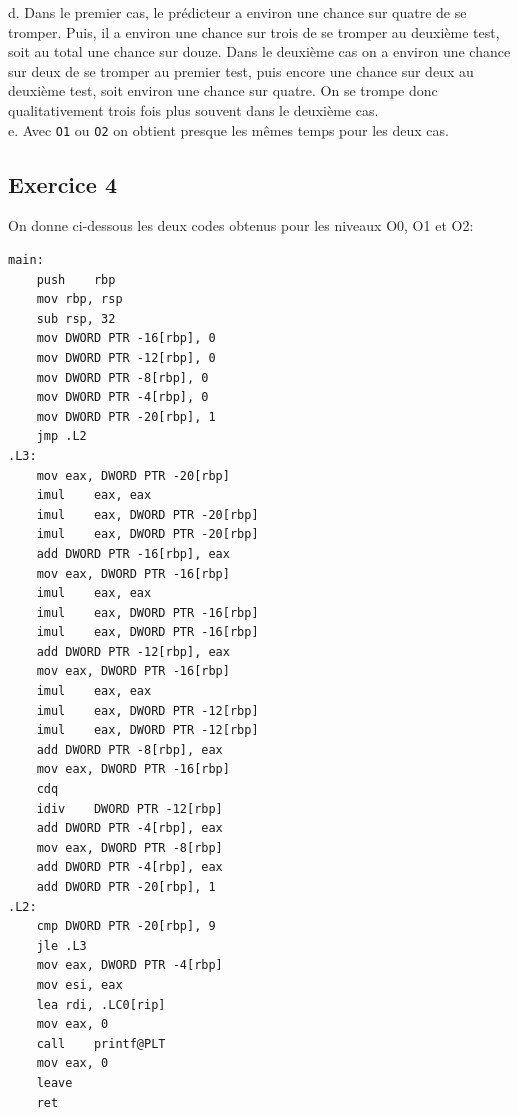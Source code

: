 \documentclass[11pt, a4 paper]{article}
\begin{document}
d. Dans le premier cas, le prédicteur a environ une chance sur quatre de se tromper. Puis, il a environ une chance sur trois de se tromper au deuxième test, soit au total une chance sur douze.
Dans le deuxième cas on a environ une chance sur deux de se tromper au premier test, puis encore une chance sur deux au deuxième test, soit environ une chance sur quatre.
On se trompe donc qualitativement trois fois plus souvent dans le deuxième cas.\\

e. Avec \texttt{O1} ou \texttt{O2} on obtient presque les mêmes temps pour les deux cas.\\

\subsection{Exercice 4}
On donne ci-dessous les deux codes obtenus pour les niveaux O0, O1 et O2:\\

\begin{lstlisting}[caption=Optimisation O0, style=customasm]
main:
	push	rbp
	mov	rbp, rsp
	sub	rsp, 32
	mov	DWORD PTR -16[rbp], 0
	mov	DWORD PTR -12[rbp], 0
	mov	DWORD PTR -8[rbp], 0
	mov	DWORD PTR -4[rbp], 0
	mov	DWORD PTR -20[rbp], 1
	jmp	.L2
.L3:
	mov	eax, DWORD PTR -20[rbp]
	imul	eax, eax
	imul	eax, DWORD PTR -20[rbp]
	imul	eax, DWORD PTR -20[rbp]
	add	DWORD PTR -16[rbp], eax
	mov	eax, DWORD PTR -16[rbp]
	imul	eax, eax
	imul	eax, DWORD PTR -16[rbp]
	imul	eax, DWORD PTR -16[rbp]
	add	DWORD PTR -12[rbp], eax
	mov	eax, DWORD PTR -16[rbp]
	imul	eax, eax
	imul	eax, DWORD PTR -12[rbp]
	imul	eax, DWORD PTR -12[rbp]
	add	DWORD PTR -8[rbp], eax
	mov	eax, DWORD PTR -16[rbp]
	cdq
	idiv	DWORD PTR -12[rbp]
	add	DWORD PTR -4[rbp], eax
	mov	eax, DWORD PTR -8[rbp]
	add	DWORD PTR -4[rbp], eax
	add	DWORD PTR -20[rbp], 1
.L2:
	cmp	DWORD PTR -20[rbp], 9
	jle	.L3
	mov	eax, DWORD PTR -4[rbp]
	mov	esi, eax
	lea	rdi, .LC0[rip]
	mov	eax, 0
	call	printf@PLT
	mov	eax, 0
	leave
	ret
\end{lstlisting}
\end{document}

